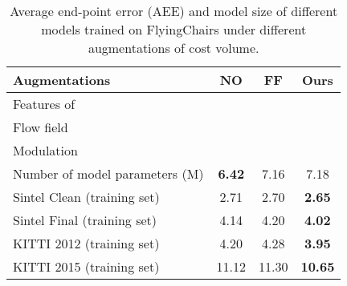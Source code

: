 \documentclass[runningheads]{llncs}
\newcommand{\cmark}{\ding{51}}
\newcommand{\xmark}{\ding{55}}
\begin{document}
\begin{table}[t]
\centering
\caption{Average end-point error (AEE) and model size of different models trained on FlyingChairs under different augmentations of cost volume.} \label{tab:results of different flow decodings}
\begin{tabular}{|cccc|}
\hline
\multicolumn{1}{|l|}{Augmentations}
&\multicolumn{1}{c|}{NO}
&\multicolumn{1}{c|}{FF}
&\multicolumn{1}{c|}{Ours}\\
\hline
\multicolumn{1}{|l|}{Features of }
&\multicolumn{1}{c|}{\xmark}
&\multicolumn{1}{c|}{\cmark}
&\multicolumn{1}{c|}{\xmark}\\

\multicolumn{1}{|l|}{Flow field}
&\multicolumn{1}{c|}{\xmark}
&\multicolumn{1}{c|}{\cmark}
&\multicolumn{1}{c|}{\xmark}\\

\multicolumn{1}{|l|}{Modulation}
&\multicolumn{1}{c|}{\xmark}
&\multicolumn{1}{c|}{\xmark}
&\multicolumn{1}{c|}{\cmark}\\
\hline\hline

\multicolumn{1}{|l|}{Number of model parameters (M)}
&\multicolumn{1}{c|}{\textbf{6.42}}
&\multicolumn{1}{c|}{7.16}
&\multicolumn{1}{c|}{7.18}\\

\multicolumn{1}{|l|}{Sintel Clean (training set)}
&\multicolumn{1}{c|}{2.71}
&\multicolumn{1}{c|}{2.70}
&\multicolumn{1}{c|}{\textbf{2.65}}\\

\multicolumn{1}{|l|}{Sintel Final (training set)}
&\multicolumn{1}{c|}{4.14}
&\multicolumn{1}{c|}{4.20}
&\multicolumn{1}{c|}{\textbf{4.02}}\\

\multicolumn{1}{|l|}{KITTI 2012 (training set)}
&\multicolumn{1}{c|}{4.20}
&\multicolumn{1}{c|}{4.28}
&\multicolumn{1}{c|}{\textbf{3.95}}\\

\multicolumn{1}{|l|}{KITTI 2015 (training set)}
&\multicolumn{1}{c|}{11.12}
&\multicolumn{1}{c|}{11.30}
&\multicolumn{1}{c|}{\textbf{10.65}}\\
\hline 
\end{tabular}
\end{table}
\end{document}

